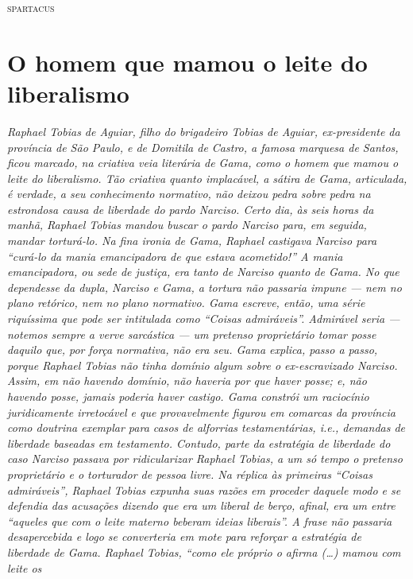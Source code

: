 \begin{flushright}
\textsc{spartacus}
\end{flushright}

\part{O homem que mamou o leite do liberalismo}

\begin{argumento}
\emph{Raphael Tobias de Aguiar, filho do brigadeiro Tobias de Aguiar,
ex-presidente da província de São Paulo, e de Domitila de Castro, a
famosa marquesa de Santos, ficou marcado, na criativa veia literária de
Gama, como o homem que mamou o leite do liberalismo. Tão criativa quanto
implacável, a sátira de Gama, articulada, é verdade, a seu conhecimento
normativo, não deixou pedra sobre pedra na estrondosa causa de liberdade
do pardo Narciso. Certo dia, às seis horas da manhã, Raphael Tobias
mandou buscar o pardo Narciso para, em seguida, mandar torturá-lo. Na
fina ironia de Gama, Raphael castigava Narciso para ``curá-lo da mania
emancipadora de que estava acometido!'' A mania emancipadora, ou sede de
justiça, era tanto de Narciso quanto de Gama. No que dependesse da
dupla, Narciso e Gama, a tortura não passaria impune --- nem no plano
retórico, nem no plano normativo. Gama escreve, então, uma série
riquíssima que pode ser intitulada como ``Coisas admiráveis''. Admirável
seria --- notemos sempre a verve sarcástica --- um pretenso proprietário
tomar posse daquilo que, por força normativa, não era seu. Gama explica,
passo a passo, porque Raphael Tobias não tinha domínio algum sobre o
ex-escravizado Narciso. Assim, em não havendo domínio, não haveria por
que haver posse; e, não havendo posse, jamais poderia haver castigo.
Gama constrói um raciocínio juridicamente irretocável e que
provavelmente figurou em comarcas da província como doutrina exemplar
para casos de alforrias testamentárias, i.e., demandas de liberdade
baseadas em testamento. Contudo, parte da estratégia de liberdade do
caso Narciso passava por ridicularizar Raphael Tobias, a um só tempo o
pretenso proprietário e o torturador de pessoa livre. Na réplica às
primeiras ``Coisas admiráveis'', Raphael Tobias expunha suas razões em
proceder daquele modo e se defendia das acusações dizendo que era um
liberal de berço, afinal, era um entre ``aqueles que com o leite materno
beberam ideias liberais''. A frase não passaria desapercebida e logo se
converteria em mote para reforçar a estratégia de liberdade de Gama.
Raphael Tobias, ``como ele próprio o afirma (\ldots{}) mamou com leite os
}
\end{argumento}

